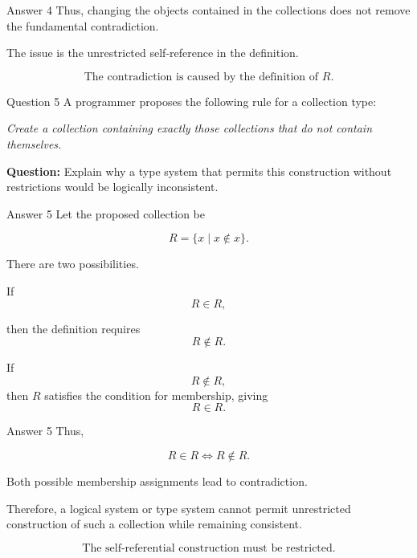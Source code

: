 \begin{frame}{Answer 4}
Thus, changing the objects contained in the collections does not remove the fundamental contradiction.

The issue is the unrestricted self-reference in the definition.

$$
\boxed{\text{The contradiction is caused by the definition of }R.}
$$

\end{frame}


\begin{frame}{Question 5}
A programmer proposes the following rule for a collection type:

\textit{Create a collection containing exactly those collections that do not contain themselves.}

\textbf{Question:} Explain why a type system that permits this construction without restrictions would be logically inconsistent.
\end{frame}

\begin{frame}{Answer 5}
Let the proposed collection be

$$
R=\{x\mid x\notin x\}.
$$

There are two possibilities.

If
$$
R\in R,
$$

then the definition requires
$$
R\notin R.
$$

If
$$
R\notin R,
$$
then $R$ satisfies the condition for membership, giving
$$
R\in R.
$$

\end{frame}

\begin{frame}{Answer 5}
Thus,

$$
R\in R\iff R\notin R.
$$

Both possible membership assignments lead to contradiction.

Therefore, a logical system or type system cannot permit unrestricted construction of such a collection while remaining consistent.

$$
\boxed{\text{The self-referential construction must be restricted.}}
$$

\end{frame}
